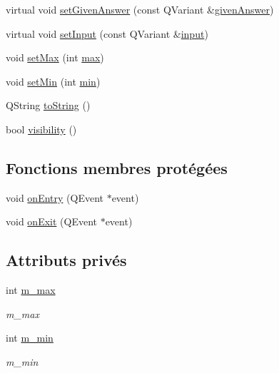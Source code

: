 \begin{DoxyCompactItemize}
\item 
virtual void \hyperlink{classSH__QuestionState_a8fec0a91aed0b2b1699db17169873eb0}{set\-Given\-Answer} (const Q\-Variant \&\hyperlink{classSH__QuestionState_a29cdea8bc55e39e3ed02d24743c30f8c}{given\-Answer})
\item 
virtual void \hyperlink{classSH__QuestionState_ab40b6202090d1afcc965e124b2deb88a}{set\-Input} (const Q\-Variant \&\hyperlink{classSH__InOutState_a8e1b78069343122df7713624a1a5a100}{input})
\item 
void \hyperlink{classSH__NumericQuestionState_a0d87ada43daef76cc5a005e277c8eea0}{set\-Max} (int \hyperlink{classSH__NumericQuestionState_ad728f30d51b325d362968e0bbd50e4f2}{max})
\item 
void \hyperlink{classSH__NumericQuestionState_a8bd47f1f69fde0e4ac2ff8e90feb65a3}{set\-Min} (int \hyperlink{classSH__NumericQuestionState_a0009413f1bd199864ad0ac5d4d7c4527}{min})
\item 
Q\-String \hyperlink{classSH__GenericState_a7779babbb40f3f8faa71112204d9804f}{to\-String} ()
\item 
bool \hyperlink{classSH__InOutState_a3a18752c4122c26a2ebf38310c9c1b75}{visibility} ()
\end{DoxyCompactItemize}
\subsection*{Fonctions membres protégées}
\begin{DoxyCompactItemize}
\item 
void \hyperlink{classSH__GenericState_a68c67ef95738e01cd34cd5926f4932fb}{on\-Entry} (Q\-Event $\ast$event)
\item 
void \hyperlink{classSH__GenericState_a7f7863859318c70c9b734be5bf5510b0}{on\-Exit} (Q\-Event $\ast$event)
\end{DoxyCompactItemize}
\subsection*{Attributs privés}
\begin{DoxyCompactItemize}
\item 
int \hyperlink{classSH__NumericQuestionState_a7c30cee8a2ff7807e9c9af7916a0ec24}{m\-\_\-max}
\begin{DoxyCompactList}\small\item\em m\-\_\-max \end{DoxyCompactList}\item 
int \hyperlink{classSH__NumericQuestionState_a4e5fe957a054249989acc1efbb79c6d8}{m\-\_\-min}
\begin{DoxyCompactList}\small\item\em m\-\_\-min \end{DoxyCompactList}\end{DoxyCompactItemize}


